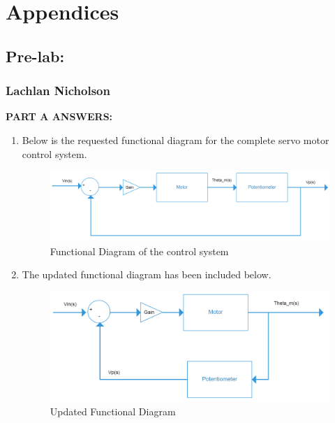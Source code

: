 \documentclass[11pt,a4paper]{article}
\begin{document}
\pagebreak
\section{Appendices}
\subsection{Pre-lab:}
\subsubsection{Lachlan Nicholson}
\textbf{PART A ANSWERS:}
\begin{enumerate}
	\item Below is the requested functional diagram for the complete servo motor control system.    
    \begin{figure}[H]
	\centering
	\includegraphics[width=.8\textwidth]{PreLach/A2a.png}
	\caption{\label{fig:funcagram}Functional Diagram of the control system}
	\end{figure}
    
    
	\item The updated functional diagram has been included below.
    \begin{figure}[H]
	\centering
	\includegraphics[width=.8\textwidth]{PreLach/A2b.png}
	\caption{\label{fig:updatedfuncagram}Updated Functional Diagram}
	\end{figure}
    
    
    

\end{enumerate}
\end{document}
